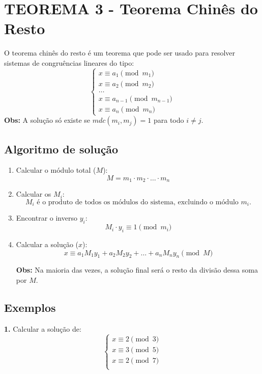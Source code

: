 \section*{TEOREMA 3 - Teorema Chinês do Resto}
O teorema chinês do resto é um teorema que pode ser usado para resolver sistemas de congruências lineares do tipo:
\[
    \begin{cases}
        x \equiv a_1 \pmod{m_1}         \\
        x \equiv a_2 \pmod{m_2}         \\
        \dots                           \\
        x \equiv a_{n-1} \pmod{m_{n-1}} \\
        x \equiv a_n \pmod{m_n}
    \end{cases}
\]
\textbf{Obs:} A solução só existe se $mdc(m_i, m_j) = 1$ para todo $i \neq j$.

\subsection*{Algoritmo de solução}
\begin{enumerate}
    \item Calcular o módulo total ($M$):
          \[
              M = m_1 \cdot m_2 \cdot \dots \cdot m_n
          \]
    \item Calcular os $M_i$:
          \[
              \text{$M_i$ é o produto de todos os módulos do sistema, excluindo o módulo $m_i$.}
          \]
    \item Encontrar o inverso $y_i$:
          \[
              M_i \cdot y_i \equiv 1 \pmod{m_i}
          \]
    \item Calcular a solução ($x$):
          \[
              x \equiv a_1 M_1 y_1 + a_2 M_2 y_2 + \dots + a_n M_n y_n \pmod M
          \]

          \textbf{Obs:} Na maioria das vezes, a solução final será o resto da divisão dessa soma por $M$.
\end{enumerate}

\subsection*{Exemplos}
\textbf{1.} Calcular a solução de:
\[
    \begin{cases}
        x \equiv 2 \pmod 3 \\
        x \equiv 3 \pmod 5 \\
        x \equiv 2 \pmod 7 \\
    \end{cases}
\]

